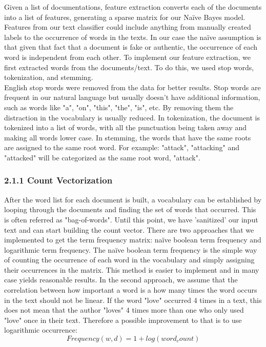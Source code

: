 \documentclass{neu_handout}
\begin{document}
Given a list of documentations, feature extraction converts each of the documents into a list of features, generating a sparse matrix for our Na\"ive Bayes model. Features from our text classifier could include anything from manually created labels to the occurrence of words in the texts. In our case the na\"ive assumption is that given that fact that a document is fake or authentic, the occurrence of each word is independent from each other. To implement our feature extraction, we first extracted words from the documents/text. To do this, we used stop words, tokenization, and stemming.\\

English stop words were removed from the data for better results. Stop words are frequent in our natural language but usually doesn't have additional information, such as words like "a", "on", "this", "the", "is", etc. By removing them the distraction in the vocabulary is usually reduced. In tokenization, the document is tokenized into a list of words, with all the punctuation being taken away and making all words lower case. In stemming, the words that have the same roots are assigned to the same root word. For example: "attack", "attacking" and "attacked" will be categorized as the same root word, "attack".

\subsubsection*{2.1.1 Count Vectorization}

After the word list for each document is built, a vocabulary can be established by looping through the documents and finding the set of words that occurred. This is often referred as "bag-of-words". Until this point, we have 'sanitized' our input text and can start building the count vector. There are two approaches that we implemented to get the term frequency matrix: na\"ive boolean term frequency and logarithmic term frequency. The na\"ive boolean term frequency is the simple way of counting the occurrence of each word in the vocabulary and simply assigning their occurrences in the matrix. This method is easier to implement and in many case yields reasonable results. In the second approach, we assume that the correlation between how important a word is a how many times the word occurs in the text should not be linear. If the word "love" occurred 4 times in a text, this does not mean that the author "loves" 4 times more than one who only used "love" once in their text. Therefore a possible improvement to that is to use logarithmic occurrence:
$$Frequency(w,d) = 1 + log(word_count)$$
 
\end{document}
